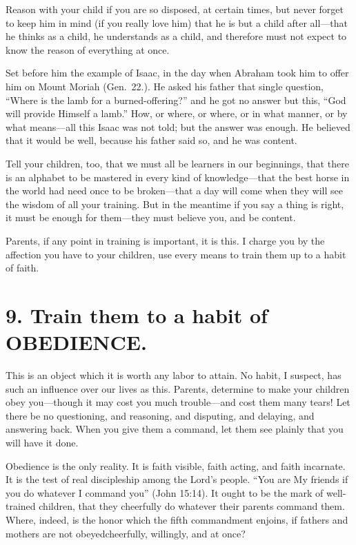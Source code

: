 \documentclass[
]{book}
\begin{document}
Reason with your child if you are so disposed, at certain times, but never forget to keep him in mind (if you really love him) that he is but a child after all---that he thinks as a child, he understands as a child, and therefore must not expect to know the reason of everything at once.

Set before him the example of Isaac, in the day when Abraham took him to offer him on Mount Moriah (Gen.~22.). He asked his father that single question, ``Where is the lamb for a burned-offering?'' and he got no answer but this, ``God will provide Himself a lamb.'' How, or where, or where, or in what manner, or by what means---all this Isaac was not told; but the answer was enough. He believed that it would be well, because his father said so, and he was content.

Tell your children, too, that we must all be learners in our beginnings, that there is an alphabet to be mastered in every kind of knowledge---that the best horse in the world had need once to be broken---that a day will come when they will see the wisdom of all your training. But in the meantime if you say a thing is right, it must be enough for them---they must believe you, and be content.

Parents, if any point in training is important, it is this. I charge you by the affection you have to your children, use every means to train them up to a habit of faith.

\hypertarget{train-them-to-a-habit-of-obedience.}{%
\section*{9. Train them to a habit of OBEDIENCE.}\label{train-them-to-a-habit-of-obedience.}}

This is an object which it is worth any labor to attain. No habit, I suspect, has such an influence over our lives as this. Parents, determine to make your children obey you---though it may cost you much trouble---and cost them many tears! Let there be no questioning, and reasoning, and disputing, and delaying, and answering back. When you give them a command, let them see plainly that you will have it done.

Obedience is the only reality. It is faith visible, faith acting, and faith incarnate. It is the test of real discipleship among the Lord's people. ``You are My friends if you do whatever I command you'' (John 15:14). It ought to be the mark of well-trained children, that they cheerfully do whatever their parents command them. Where, indeed, is the honor which the fifth commandment enjoins, if fathers and mothers are not obeyedcheerfully, willingly, and at once?
\end{document}
